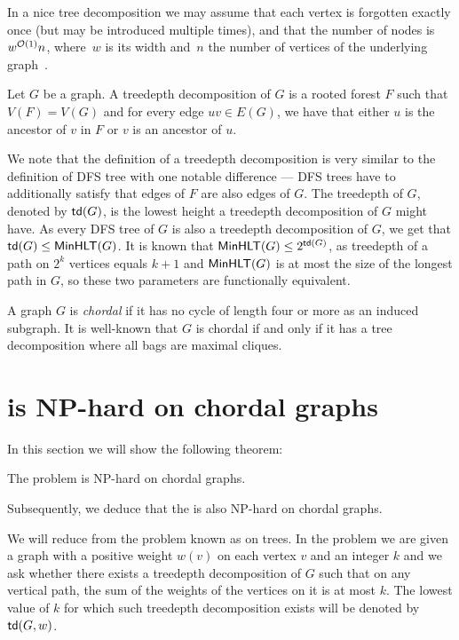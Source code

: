 \documentclass[a4paper,11pt]{article}
\begin{document}
In a nice tree decomposition we may assume that each vertex is forgotten exactly once (but may be introduced multiple times), and that the number of nodes is $w^{{\mathcal{O}}(1)}n$, where~$w$ is its width and~$n$ the number of vertices of the underlying graph~\cite{CyganEtAl15}.



\begin{definition}
Let $G$ be a graph. A treedepth decomposition of $G$ is a rooted forest $F$ such that $V(F) = V(G)$ and for every edge $uv \in E(G)$, we have that either $u$ is the ancestor of $v$ in $F$ or $v$ is an ancestor of $u$.
\end{definition}

We note that the definition of a treedepth decomposition is very similar to the definition of DFS tree with one notable difference --- DFS trees have to additionally satisfy that edges of $F$ are also edges of $G$. The treedepth of $G$, denoted by $\mathsf{td}(G)$, is the lowest height a treedepth decomposition of $G$ might have. As every DFS tree of $G$ is also a treedepth decomposition of $G$, we get that $\mathsf{td}(G) \le \mathsf{MinHLT}(G)$. It is known that $\mathsf{MinHLT}(G) \le 2^{\mathsf{td}(G)}$, as treedepth of a path on $2^k$ vertices equals $k+1$ \cite{Nesetril2012} and $\mathsf{MinHLT}(G)$ is at most the size of the longest path in $G$, so these two parameters are functionally equivalent. 

%
A graph $G$ is \emph{chordal} if it has no cycle of length four or more as an induced subgraph.
It is well-known that $G$ is chordal if and only if it has a tree decomposition where all bags are maximal cliques.

\section{\MinHProb is NP-hard on chordal graphs} \label{sectn:Np-hard}

In this section we will show the following theorem:

\begin{theorem} \label{thm:NP-hard-chordal}
The \MinHProb problem is NP-hard on chordal graphs. 
\end{theorem}

Subsequently, we deduce that the \DualMinHProb is also NP-hard on chordal graphs.

We will reduce from the problem known as  on trees. In the  problem we are given a graph with a positive weight $w(v)$ on each vertex $v$ and an integer $k$ and we ask whether there exists a treedepth decomposition of $G$ such that on any vertical path, the sum of the weights of the vertices on it is at most $k$. 
The lowest value of $k$ for which such treedepth decomposition exists will be denoted by $\mathsf{td}(G, w)$.
\end{document}
